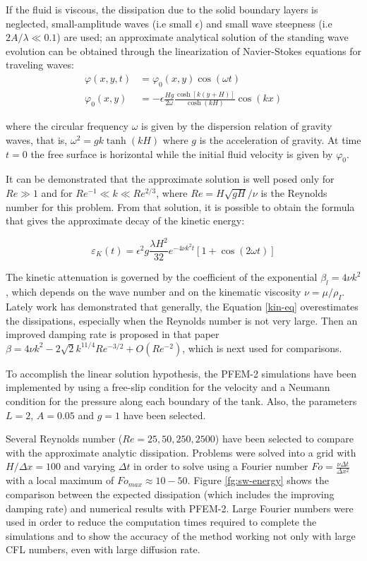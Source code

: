 \documentclass[a4paper,conference]{IEEEtran}
\begin{document}
If the fluid is viscous, the dissipation due to the solid boundary layers is neglected, small-amplitude waves (i.e small $\epsilon$) and small wave steepness (i.e $2A/\lambda \ll 0.1$) are used; an approximate analytical solution of the standing wave evolution can be obtained through the linearization of Navier-Stokes equations for traveling waves:
\begin{align}
 \varphi(x,y,t) & = \varphi_0(x,y)\cos(\omega t) \\
 \varphi_0(x,y) & =-\epsilon\frac{Hg}{2\omega}\frac{\cosh\left[k(y+H)\right]}{\cosh(kH)}\cos(kx)
\end{align}

where the circular frequency $\omega$ is given by the dispersion relation of gravity waves, that is, $\omega^2 = g k \tanh(kH)$ where $g$ is the acceleration of gravity. At time $t = 0$ the free surface is horizontal while the initial fluid velocity is given by $\varphi_0$.

It can be demonstrated that the approximate solution is well posed only for $Re\gg1$ and for $Re^{-1}\ll k \ll Re^{2/3}$, where $Re=H\sqrt{gH}/\nu$ is the Reynolds number for this problem. From that solution, it is possible to obtain the formula that gives the approximate decay of the kinetic energy\cite{Lighthill01}:

\begin{equation}
 \varepsilon_K(t) = \epsilon^2g\frac{\lambda H^2}{32}e^{-4\nu k^2t}\left[1+\cos(2\omega t)\right]
 \label{kin-eq}
\end{equation}

The kinetic attenuation is governed by the coefficient of the exponential $\beta_l = 4\nu k^2$, which depends on the wave number and on the kinematic viscosity $\nu = \mu/\rho_{I}$. Lately work\cite{Antuono13} has demonstrated that generally, the Equation \ref{kin-eq} overestimates the dissipations, especially when the Reynolds number is not very large. Then an improved damping rate is proposed in that paper $\beta = 4\nu k^2 -  2\sqrt{2}k^{11/4}Re^{-3/2}+O(Re^{-2})$, which is next used for comparisons.

To accomplish the linear solution hypothesis, the PFEM-2 simulations have been implemented by using a free-slip condition for the velocity and a Neumann condition for the pressure along each boundary of the tank. Also, the parameters $L=2$, $A=0.05$ and $g=1$ have been selected.

Several Reynolds number ($Re=25,50,250,2500$) have been selected to compare with the approximate analytic dissipation. Problems were solved into a grid with $H/\Delta x=100$ and varying $\Delta t$ in order to solve using a Fourier number $Fo=\frac{\nu\Delta t}{\Delta x^2}$ with a local maximum of $Fo_{max}\approx10-50$. Figure \ref{fg:sw-energy} shows the comparison between the expected dissipation (which includes the improving damping rate) and numerical results with PFEM-2. Large Fourier numbers were used in order to reduce the computation times required to complete the simulations and to show the accuracy of the method working not only with large CFL numbers, even with large diffusion rate.
\end{document}
